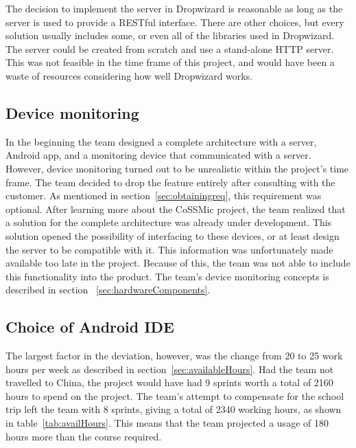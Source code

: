 The decision to implement the server in Dropwizard is reasonable as long as the server is used to provide a RESTful interface. There are other choices, but every solution usually includes some, or even all of the libraries used in Dropwizard. The server could be created from scratch and use a stand-alone HTTP server. This was not feasible in the time frame of this project, and would have been a waste of resources considering how well Dropwizard works.

\subsection{Device monitoring}
In the beginning the team designed a complete architecture with a server, Android app, and a monitoring device that communicated with a server. However, device monitoring turned out to be unrealistic within the project's time frame. The team decided to drop the feature entirely after consulting with the customer. As mentioned in section~\ref{sec:obtainingreq}, this requirement was optional.
After learning more about the CoSSMic project, the team realized that a solution for the complete architecture was already under development. This solution opened the possibility of interfacing to these devices, or at least design the server to be compatible with it. This information was unfortunately made available too late in the project. Because of this, the team was not able to include this functionality into the product. 
The team's device monitoring concepts is described in section ~\ref{sec:hardwareComponents}.

\subsection{Choice of Android IDE}



The largest factor in the deviation, however, was the change from 20 to 25 work hours per week as described in section~\ref{sec:availableHours}. Had the team not travelled to China, the project would have had 9 sprints worth a total of 2160 hours to spend on the project. The team's attempt to compensate for the school trip left the team with 8 sprints, giving a total of 2340 working hours, as shown in table~\ref{tab:availHours}. This means that the team projected a usage of 180 hours more than the course required.

